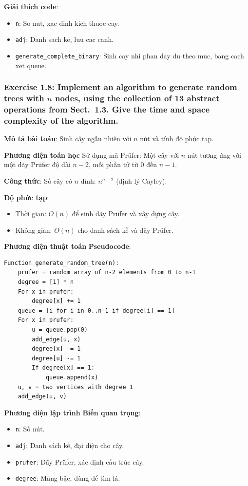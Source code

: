 \documentclass[a4paper,12pt]{article}
\begin{document}
\bigskip
\textbf{Giải thích code}:
\begin{itemize}
    \item \texttt{n}: So nut, xac dinh kich thuoc cay.
    \item \texttt{adj}: Danh sach ke, luu cac canh.
    \item \texttt{generate\_complete\_binary}: Sinh cay nhi phan day du theo muc, bang cach xet queue.
\end{itemize}

\subsubsection{Exercise 1.8: Implement an algorithm to generate random trees with $n$ nodes, using the collection of 13 abstract operations from Sect.~1.3. Give the time and space complexity of the algorithm.}
\textbf{Mô tả bài toán}: Sinh cây ngẫu nhiên với \( n \) nút và tính độ phức tạp.

\textbf{Phương diện toán học}
Sử dụng mã Prüfer: Một cây với \( n \) nút tương ứng với một dãy Prüfer độ dài \( n-2 \), mỗi phần tử từ \( 0 \) đến \( n-1 \).

\textbf{Công thức}: Số cây có \( n \) đỉnh: \( n^{n-2} \) (định lý Cayley).

\textbf{Độ phức tạp}:
\begin{itemize}
    \item Thời gian: \( O(n) \) để sinh dãy Prüfer và xây dựng cây.
    \item Không gian: \( O(n) \) cho danh sách kề và dãy Prüfer.
\end{itemize}

\textbf{Phương diện thuật toán}
\textbf{Pseudocode}:
\begin{verbatim}
Function generate_random_tree(n):
    prufer = random array of n-2 elements from 0 to n-1
    degree = [1] * n
    For x in prufer:
        degree[x] += 1
    queue = [i for i in 0..n-1 if degree[i] == 1]
    For x in prufer:
        u = queue.pop(0)
        add_edge(u, x)
        degree[x] -= 1
        degree[u] -= 1
        If degree[x] == 1:
            queue.append(x)
    u, v = two vertices with degree 1
    add_edge(u, v)
\end{verbatim}

\textbf{Phương diện lập trình}
\textbf{Biến quan trọng}:
\begin{itemize}
    \item \texttt{n}: Số nút.
    \item \texttt{adj}: Danh sách kề, đại diện cho cây.
    \item \texttt{prufer}: Dãy Prüfer, xác định cấu trúc cây.
    \item \texttt{degree}: Mảng bậc, dùng để tìm lá.
\end{itemize}
\end{document}
